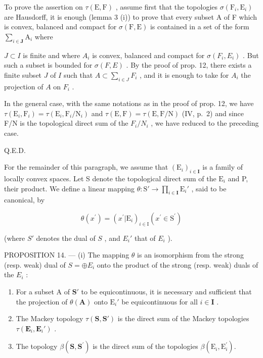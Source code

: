 To prove the assertion on \(\tau(\mathrm{E},\mathrm{F})\) , assume first that the topologies \(\sigma(\mathrm{F}_i,\mathrm{E}_i)\) are Hausdorff, it is enough (lemma 3 (i)) to prove that every subset A of F which is convex, balanced and compact for \(\sigma(\mathrm{F},\mathrm{E})\) is contained in a set of the form \(\sum_{i\in\mathbf{J}}\mathrm{A}_i\) where

\(J \subset I\) is finite and where \(A_{i}\) is convex, balanced and compact for \(\sigma(F_{i}, E_{i})\) . But such a subset is bounded for \(\sigma(F, E)\) . By the proof of prop. 12, there exists a finite subset \(J\) of \(I\) such that \(A \subset \sum_{i \in J} F_i\) , and it is enough to take for \(A_i\) the projection of \(A\) on \(F_i\) .

In the general case, with the same notations as in the proof of prop. 12, we have \(\tau(\mathrm{E}_{i},\mathrm{F}_{i})=\tau(\mathrm{E}_{i},\mathrm{F}_{i}/\mathrm{N}_{i})\) and \(\tau(\mathrm{E},\mathrm{F})=\tau(\mathrm{E},\mathrm{F}/\mathrm{N})\) (IV, p.~2) and since F/N is the topological direct sum of the \(F_{i}/N_{i}\) , we have reduced to the preceding case.

Q.E.D.

For the remainder of this paragraph, we assume that \((\mathrm{E}_i)_{i\in \mathbf{I}}\) is a family of locally convex spaces. Let S denote the topological direct sum of the \(\mathrm{E}_i\) and P, their product. We define a linear mapping \(\theta :\mathrm{S}'\to \prod_{i\in \mathbf{I}}\mathrm{E}_i'\) , said to be canonical, by

\[
\theta (x ^ {\prime}) = (x ^ {\prime} | \mathrm{E} _ {i}) _ {i \in \mathrm{I}} (x ^ {\prime} \in \mathrm{S} ^ {\prime})\tag{10}
\]

(where \(S'\) denotes the dual of \(S\) , and \(E_i'\) that of \(E_i\) ).

PROPOSITION 14. --- (i) The mapping \(\theta\) is an isomorphism from the strong (resp. weak) dual of \(S = \oplus E_i\) onto the product of the strong (resp. weak) duals of the \(E_i\) :

\begin{enumerate}
\def\labelenumi{(\roman{enumi})}
\setcounter{enumi}{1}
\item
  For a subset A of \(\mathbf{S}'\) to be equicontinuous, it is necessary and sufficient that the projection of \(\theta (\mathbf{A})\) onto \(\mathrm{E}_i'\) be equicontinuous for all \(i\in \mathbf{I}\) .
\item
  The Mackey topology \(\tau(\mathbf{S},\mathbf{S}')\) is the direct sum of the Mackey topologies \(\tau(\mathbf{E}_i,\mathbf{E}_i')\) .
\item
  The topology \(\beta (\mathbf{S},\mathbf{S}^{\prime})\) is the direct sum of the topologies \(\beta (\mathrm{E}_i,\mathrm{E}_i^{\prime})\).
\end{enumerate}

